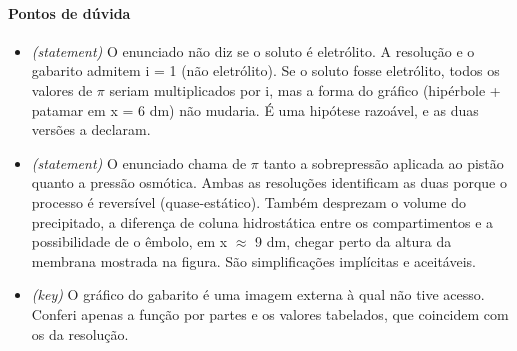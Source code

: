 \documentclass{article}%
\begin{document}
\paragraph{Pontos de dúvida}%
\begin{itemize}%
\item%
\textit{(statement)} O enunciado não diz se o soluto é eletrólito. A resolução e o gabarito admitem i = 1 (não eletrólito). Se o soluto fosse eletrólito, todos os valores de $\pi$ seriam multiplicados por i, mas a forma do gráfico (hipérbole + patamar em x = 6 dm) não mudaria. É uma hipótese razoável, e as duas versões a declaram.%
\item%
\textit{(statement)} O enunciado chama de $\pi$ tanto a sobrepressão aplicada ao pistão quanto a pressão osmótica. Ambas as resoluções identificam as duas porque o processo é reversível (quase{-}estático). Também desprezam o volume do precipitado, a diferença de coluna hidrostática entre os compartimentos e a possibilidade de o êmbolo, em x $\approx$ 9 dm, chegar perto da altura da membrana mostrada na figura. São simplificações implícitas e aceitáveis.%
\item%
\textit{(key)} O gráfico do gabarito é uma imagem externa à qual não tive acesso. Conferi apenas a função por partes e os valores tabelados, que coincidem com os da resolução.%
\end{itemize}%
\end{document}
